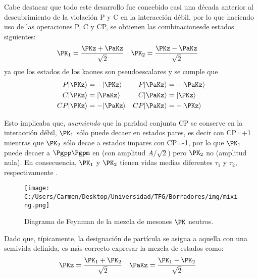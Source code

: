 Cabe destacar que todo este desarrollo fue concebido casi una década anterior al descubrimiento de la violación P y C en la interacción débil, por lo que haciendo uso de las operaciones P, C y CP, se obtienen las combinaciones\protect\footnotemark de estados siguientes:
\begin{align}
\PK_{1} &= \dfrac{\PKz + \PaKz}{\sqrt{2}} & \PK_{2} &= \dfrac{\PKz - \PaKz}{\sqrt{2}}\label{eq:k1k2def}
\end{align}
ya que los estados de los kaones son pseudoescalares y se cumple que \cite{Griffiths2008}
\begin{align}
P|\PKz\rangle &= -|\PKz\rangle & P|\PaKz\rangle &= -|\PaKz\rangle\\
C|\PKz\rangle &= |\PaKz\rangle & C|\PaKz\rangle &= |\PKz\rangle\\
CP|\PKz\rangle &= -|\PaKz\rangle & CP|\PaKz\rangle &= -|\PKz\rangle
\end{align}


Esto implicaba que, \textit{asumiendo} que la paridad conjunta CP se conserve en la interacción débil, $\PK_{1}$ sólo puede decaer en estados pares, es decir con CP=+1 mientras que $\PK_{2}$ sólo decae a estados impares con CP=-1, por lo que $\PK_{1}$  puede decaer a $\Pgpp \Pgpm$ en (con amplitud $A/ \sqrt{2}$) pero $\PK_{2}$ no (amplitud nula). En consecuencia, $\PK_{1}$ y $\PK_{2}$ tienen vidas medias diferentes $\tau_{1}$ y $\tau_{2}$, respectivamente \cite{Pais} \cite{Perkins}.

\begin{figure}[!ht]
	\centering
	\texttt{[image: C:/Users/Carmen/Desktop/Universidad/TFG/Borradores/img/mixing.png]}
	\caption[Diagrama de Feynmann de la mezcla de mesones $\PK$ neutros]
	{Diagrama de Feynman de la mezcla de mesones $\PK$ neutros. \cite{Helsinki}}
	\label{fig:kaonmix}
\end{figure}

Dado que, típicamente, la designación de partícula se asigna a aquella con una semivida definida, es más correcto expresar la mezcla de estados como:
\begin{align}
\PKz &= \dfrac{\PK_{1} + \PK_{2}}{\sqrt{2}} & \PaKz &= \dfrac{\PK_{1} - \PK_{2}}{\sqrt{2}}\label{eq:k1k2defbuena}
\end{align}

